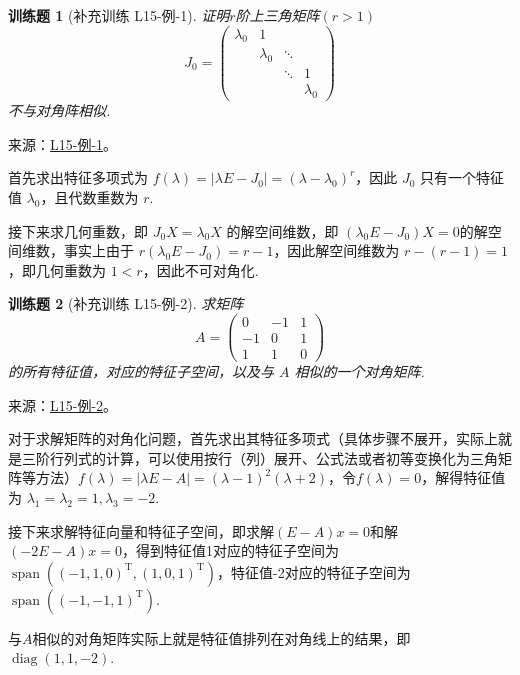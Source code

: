 \documentclass[UTF8,12pt,a4paper,fontset=fandol]{ctexart}
\newtheorem{exercise}{训练题}[section]
\begin{document}
\begin{exercise}[补充训练 L15-例-1]\label{prob:L15-例-1}
证明$r$阶上三角矩阵$(r>1)$
    \[J_0=\begin{pmatrix}
            \lambda_0 & 1         &        &           \\
                      & \lambda_0 & \ddots &           \\
                      &           & \ddots & 1         \\
                      &           &        & \lambda_0
        \end{pmatrix}\]
    不与对角阵相似.
\end{exercise}
\noindent 来源：\href{https://github.com/yhwu-is/Linear-Algebra-Left-Undone/blob/new/%E8%AE%B2%E4%B9%89/%E4%B8%93%E9%A2%98/15%20%E7%9B%B8%E4%BC%BC%E6%A0%87%E5%87%86%E5%BD%A2%EF%BC%9A%E5%A4%8D%E6%95%B0%E5%9F%9F%E4%B8%8A%E7%9A%84%E5%B0%9D%E8%AF%95%E4%B8%8E%E7%90%86%E8%AE%BA.tex}{L15-例-1}。
\begin{solve}
首先求出特征多项式为 $f(\lambda) = |\lambda E - J_0| = (\lambda - \lambda_0)^r$，因此 $J_0$ 只有一个特征值 $\lambda_0$，且代数重数为 $r$.

    接下来求几何重数，即 $J_0X = \lambda_0X$ 的解空间维数，即 $(\lambda_0 E - J_0)X = 0$的解空间维数，事实上由于 $r(\lambda_0 E - J_0) = r - 1$，因此解空间维数为 $r - (r - 1) = 1$，即几何重数为 $1 < r$，因此不可对角化.
\end{solve}

\begin{exercise}[补充训练 L15-例-2]\label{prob:L15-例-2}
求矩阵
    \[A=\begin{pmatrix}
            0  & -1 & 1 \\
            -1 & 0  & 1 \\
            1  & 1  & 0
        \end{pmatrix}\]
    的所有特征值，对应的特征子空间，以及与 $A$ 相似的一个对角矩阵.
\end{exercise}
\noindent 来源：\href{https://github.com/yhwu-is/Linear-Algebra-Left-Undone/blob/new/%E8%AE%B2%E4%B9%89/%E4%B8%93%E9%A2%98/15%20%E7%9B%B8%E4%BC%BC%E6%A0%87%E5%87%86%E5%BD%A2%EF%BC%9A%E5%A4%8D%E6%95%B0%E5%9F%9F%E4%B8%8A%E7%9A%84%E5%B0%9D%E8%AF%95%E4%B8%8E%E7%90%86%E8%AE%BA.tex}{L15-例-2}。
\begin{solve}
对于求解矩阵的对角化问题，首先求出其特征多项式（具体步骤不展开，实际上就是三阶行列式的计算，可以使用按行（列）展开、公式法或者初等变换化为三角矩阵等方法）$f(\lambda)=|\lambda E-A|=(\lambda-1)^2(\lambda+2)$，令$f(\lambda)=0$，解得特征值为 $\lambda_1=\lambda_2=1,\lambda_3=-2$.

    接下来求解特征向量和特征子空间，即求解$(E-A)x=0$和解$(-2E-A)x=0$，得到特征值1对应的特征子空间为$\operatorname{span}((-1,1,0)^{\mathrm{T}},(1,0,1)^{\mathrm{T}})$，特征值-2对应的特征子空间为$\operatorname{span}((-1,-1,1)^{\mathrm{T}})$.

    与$A$相似的对角矩阵实际上就是特征值排列在对角线上的结果，即 $\operatorname{diag}(1,1,-2)$.
\end{solve}
\end{document}
